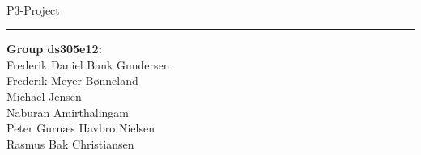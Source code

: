 \newcommand{\HRule}[1]{\hfill \rule{0.2\linewidth}{#1}}

\thispagestyle{empty}
\vspace*{1.5cm}

\noindent \colorbox{Sapphire}{
\parbox[t]{1.0\linewidth}{
\centering \fontsize{45pt}{80pt}\selectfont
\vspace*{1.0cm}
        \textcolor{White}{
\vspace*{0.7cm}
        }
}
}
\\[2em]
\huge P3-Project

\vfill
\flushright
\flushright \rule[20pt]{0.1pt}{9em} \begin{minipage}[b]{0.50\linewidth}
{
\Large
\textbf{Group ds305e12:} \\
Frederik Daniel Bank Gundersen\\
Frederik Meyer Bønneland\\
Michael Jensen\\
Naburan Amirthalingam\\
Peter Gurnæs Havbro Nielsen\\
Rasmus Bak Christiansen\\
}
\end{minipage}
\clearpage 
